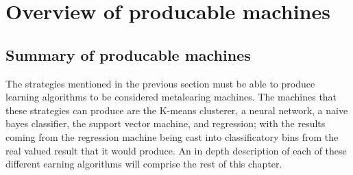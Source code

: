 \usepackage{amssymb}
\chapter{Overview of producable machines}
\label{Chapter3}

\newcommand{\keyword}[1]{\textbf{#1}}
\newcommand{\tabhead}[1]{\textbf{#1}}
\newcommand{\code}[1]{\texttt{#1}}
\newcommand{\file}[1]{\texttt{\bfseries#1}}
\newcommand{\option}[1]{\texttt{\itshape#1}}

\section{Summary of producable machines}
The strategies mentioned in the previous section must be able to produce learning algorithms
to be considered metalearing machines. The machines that these strategies can produce are
the K-means clusterer, a neural network, a naive bayes classifier, the support vector machine,
and regression; with the results coming from the regression machine being cast into
classificatory bins from the real valued result that it would produce. An in depth
description of each of these different earning algorithms will comprise the rest of
this chapter.
